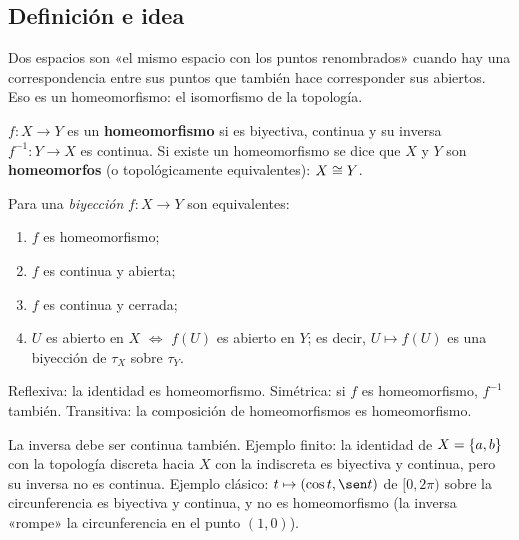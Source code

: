 \subsection{Definición e idea}
Dos espacios son «el mismo espacio con los puntos renombrados» cuando hay una correspondencia entre sus puntos que
también hace corresponder sus abiertos. Eso es un homeomorfismo: el isomorfismo de la topología.
\begin{definicion}
$f:X\to Y$ es un \textbf{homeomorfismo} si es biyectiva, continua y su inversa $f^{-1}:Y\to X$ es continua. Si existe
un homeomorfismo se dice que $X$ y $Y$ son \textbf{homeomorfos} (o topológicamente equivalentes): $X\cong Y$.
\end{definicion}
\begin{teorema}
Para una \emph{biyección} $f:X\to Y$ son equivalentes:
\begin{enumerate}[label=(\alph*),leftmargin=1.9em]
\item $f$ es homeomorfismo;
\item $f$ es continua y abierta;
\item $f$ es continua y cerrada;
\item $U$ es abierto en $X$ $\iff$ $f(U)$ es abierto en $Y$; es decir, $U\mapsto f(U)$ es una biyección de $\tau_X$
sobre $\tau_Y$.
\end{enumerate}
\end{teorema}
\begin{teorema}
Reflexiva: la identidad es homeomorfismo. Simétrica: si $f$ es homeomorfismo, $f^{-1}$ también. Transitiva: la
composición de homeomorfismos es homeomorfismo.
\end{teorema}

\begin{ojo}
La inversa debe ser continua también. Ejemplo finito: la identidad de $X=\{a,b\}$ con la topología discreta hacia
$X$ con la indiscreta es biyectiva y continua, pero su inversa no es continua. Ejemplo clásico:
$t\mapsto(\cos t,\sen t)$ de $[0,2\pi)$ sobre la circunferencia es biyectiva y continua, y no es homeomorfismo
(la inversa «rompe» la circunferencia en el punto $(1,0)$).
\end{ojo}


